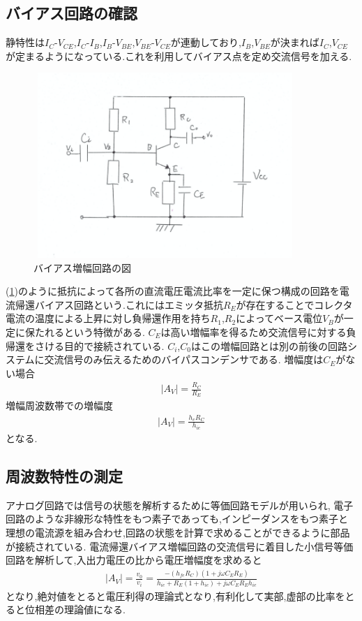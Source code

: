 \documentclass[a4j,10pt,dvipdfmx]{jarticle}
\begin{document}
\subsection{バイアス回路の確認}
静特性は$I_C$-$V_{CE}$,$I_C$-$I_B$,$I_B$-$V_{BE}$,$V_{BE}$-$V_{CE}$が連動しており,$I_B$,$V_{BE}$が決まれば$I_C$,$V_{CE}$が定まるようになっている.これを利用してバイアス点を定め交流信号を加える.
\begin{figure}[H]
  \label{bias}
  \begin{center}
  \includegraphics[height=7cm,width=10cm]{bias.png}
  \caption{バイアス増幅回路の図}
\end{center}
\end{figure}
(\ref{bias})のように抵抗によって各所の直流電圧電流比率を一定に保つ構成の回路を電流帰還バイアス回路という.これにはエミッタ抵抗$R_E$が存在することでコレクタ電流の温度による上昇に対し負帰還作用を持ち$R_1$,$R_2$によってベース電位$V_B$が一定に保たれるという特徴がある.
$C_E$は高い増幅率を得るため交流信号に対する負帰還をさける目的で接続されている.
$C_i$,$C_0$はこの増幅回路とは別の前後の回路システムに交流信号のみ伝えるためのバイパスコンデンサである.
増幅度は$C_E$がない場合
\begin{eqnarray}
  \label{z1}
  |A_{V}| = \frac{R_C}{R_E}
\end{eqnarray}
増幅周波数帯での増幅度
\begin{eqnarray}
  \label{z2}
  |A_{V}| = \frac{h_{e}R_{C}}{h_{ie}}
\end{eqnarray}
となる.

\subsection{周波数特性の測定}
アナログ回路では信号の状態を解析するために等価回路モデルが用いられ, 電子回路のような非線形な特性をもつ素子であっても,インピーダンスをもつ素子と理想の電流源を組み合わせ,回路の状態を計算で求めることができるように部品が接続されている.
電流帰還バイアス増幅回路の交流信号に着目した小信号等価回路を解析して,入出力電圧の比から電圧増幅度を求めると
\begin{eqnarray}
  \label{z3}
  |A_{V}| = \frac{v_0}{v_i}= \frac{-(h_{fe}R_C)(1+j\omega{C_E}{R_E})}{h_{ie}+R_E(1+h_{ie})+j\omega{C_E}{R_E}h_{ie}}
\end{eqnarray}
となり,絶対値をとると電圧利得の理論式となり,有利化して実部,虚部の比率をとると位相差の理論値になる.
\end{document}
